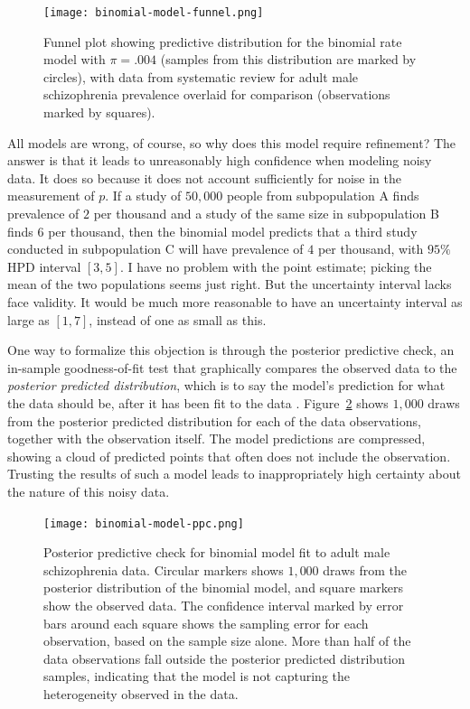 \begin{figure}[ht]
\begin{center}
\texttt{[image: binomial-model-funnel.png]}
\end{center}
\caption{Funnel plot showing predictive distribution for the binomial
  rate model with $\pi=.004$ (samples from this distribution are
  marked by circles), with data from systematic review for adult male
  schizophrenia prevalence overlaid for comparison (observations
  marked by squares).}
\label{rate-model-binom-funnel}
\end{figure}

All models are wrong, of course, so why does this model require
refinement? The answer is that it leads to unreasonably high
confidence when modeling noisy data.  It does so because it does not
account sufficiently for noise in the measurement of $p$. If a study
of $50,000$ people from subpopulation A finds prevalence of $2$ per
thousand and a study of the same size in subpopulation B finds $6$ per
thousand, then the binomial model predicts that a third study
conducted in subpopulation C will have prevalence of $4$ per thousand,
with $95\%$ HPD interval $[3,5]$.  I have no problem with the point
estimate; picking the mean of the two populations seems just right.
But the uncertainty interval lacks face validity.  It would be much
more reasonable to have an uncertainty interval as large as $[1,7]$,
instead of one as small as this.

One way to formalize this objection is through the posterior
predictive check, an in-sample goodness-of-fit test that graphically
compares the observed data to the \emph{posterior predicted
  distribution}, which is to say the model's prediction for what the
data should be, after it has been fit to the data \cite{Gelman book or
  paper}.  Figure~\ref{rate-model-binom-ppc} shows $1,000$ draws from
the posterior predicted distribution for each of the data
observations, together with the observation itself.  The model
predictions are compressed, showing a cloud of predicted points that
often does not include the observation.  Trusting the results of such
a model leads to inappropriately high certainty about the nature of
this noisy data.

\begin{figure}[ht]
\begin{center}
\texttt{[image: binomial-model-ppc.png]}
\caption{Posterior predictive check for binomial model fit to adult
  male schizophrenia data.  Circular markers shows $1,000$ draws from
  the posterior distribution of the binomial model, and square markers
  show the observed data.  The confidence interval marked by error
  bars around each square shows the sampling error for each
  observation, based on the sample size alone. More than half of the
  data observations fall outside the posterior predicted distribution
  samples, indicating that the model is not capturing the
  heterogeneity observed in the data.}
\label{rate-model-binom-ppc}
\end{center}
\end{figure}


